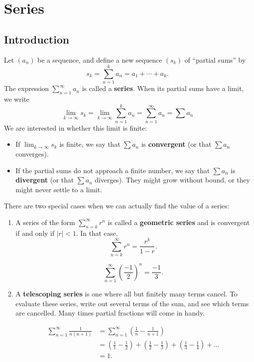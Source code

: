\section{Series}
\label{sec:series}

\subsection{Introduction}

Let $(a_n)$ be a sequence, and define a new sequence $(s_k)$ of ``partial sums'' by
$$s_k=\sum_{n=1}^k a_n = a_1 + \cdots + a_k.$$
The expression $\sum_{n=1}^{\infty}a_n$ is called a \textbf{series}.
When its partial sums have a limit, we write
$$\lim _{k \to \infty} s_{k}=\lim _{k \to \infty} \sum_{n=1}^{k} a_{n}=\sum_{n=1}^{\infty} a_{n}=\sum a_n$$
We are interested in whether this limit is finite:
\begin{itemize}
    \item If $\displaystyle\lim _{k \to \infty} s_{k}$ is finite, we say that $\sum a_n$ is \textbf{convergent} (or that $\sum a_n$ converges).
    \item If the partial sums do not approach a finite number, we say that
    $\sum a_n$ is \textbf{divergent} (or that $\sum a_n$ diverges).
    They might grow without bound, or they might never settle to a limit.
\end{itemize}
There are two special cases when we can actually find the value of a series:
\begin{enumerate}
\item {}A series of the form $\displaystyle\sum_{n=k}^\infty r^n$ is called a \textbf{geometric series} and is convergent if and only if $|r|<1$. In that case,
$$\sum_{n=k}^\infty r^n=\frac{r^k}{1-r}.$$
\begin{exampleblock}
$$\sum_{n=1}^\infty \left(\frac{-1}{2}\right)^n=\frac{-1}{3}.$$
\end{exampleblock}

\item A \textbf{telescoping series} is one where all but finitely many terms cancel. To evaluate these series, write out several terms of the sum, and see which terms are cancelled. Many times partial fractions will come in handy.
\begin{exampleblock}
$$\begin{aligned}
\sum_{n=1}^\infty\frac{1}{n(n+1)}
&=\sum_{n=1}^\infty\left(\frac{1}{n}-\frac{1}{n+1}\right)\\
&=\left(\frac{1}{1}-\frac{1}{2}\right)+\left(\frac{1}{2}-\frac{1}{3}\right)
 +\left(\frac{1}{3}-\frac{1}{4}\right)+\dots\\
&=1.
\end{aligned}$$
\end{exampleblock}
\end{enumerate}



